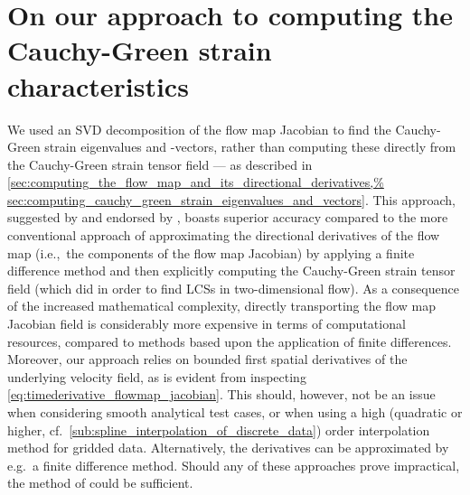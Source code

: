 \section[On our approach to computing the Cauchy-Green
strain characteristics] {On our approach to computing the%
    \\\phantom{5.1} Cauchy-Green strain characteristics}
\label{sec:on_our_approach_to_computing_the_cauchy_green%
_strain_characteristics}

We used an SVD decomposition of the flow map Jacobian to find the Cauchy-Green
strain eigenvalues and -vectors, rather than computing these directly from the
Cauchy-Green strain tensor field --- as described in
\cref{sec:computing_the_flow_map_and_its_directional_derivatives,%
sec:computing_cauchy_green_strain_eigenvalues_and_vectors}. This approach,
suggested by \textcite{miron2012anisotropic} and endorsed by
\textcite{oettinger2016autonomous}, boasts superior accuracy compared to the
more conventional approach of approximating the directional derivatives of the
flow map (i.e.,\ the components of the flow map Jacobian) by applying a finite
difference method and then explicitly computing the Cauchy-Green strain
tensor field (which \textcite{farazmand2012computing} did in order to find LCSs
in two-dimensional flow). As a consequence of the increased mathematical
complexity, directly transporting the flow map Jacobian field is considerably
more expensive in terms of computational resources, compared to methods based
upon the application of finite differences. Moreover, our approach relies on
bounded first spatial derivatives of the underlying velocity field, as is
evident from inspecting \cref{eq:timederivative_flowmap_jacobian}. This should,
however, not be an issue when considering smooth analytical test cases, or when
using a high (quadratic or higher, cf.\
\cref{sub:spline_interpolation_of_discrete_data}) order interpolation method
for gridded data. Alternatively, the derivatives can be approximated by e.g.\ a
finite difference method. Should any of these approaches prove impractical, the
method of \textcite{farazmand2012computing} could be sufficient.

